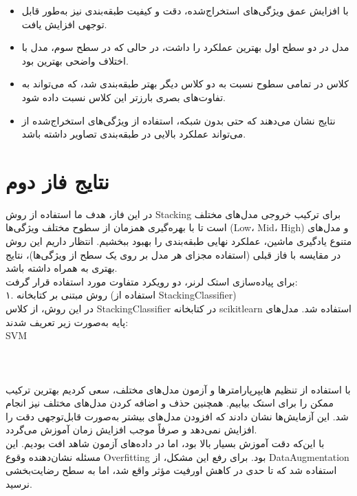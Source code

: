 \documentclass[a4paper,12pt]{article}
\let\nobreaksection\section
\renewcommand{\section}{\nobreaksection}
\begin{document}
\begin{itemize}
	\item با افزایش عمق ویژگی‌های استخراج‌شده، دقت و کیفیت طبقه‌بندی نیز به‌طور قابل توجهی افزایش یافت.
	\item مدل  در دو سطح اول بهترین عملکرد را داشت، در حالی که در سطح سوم، مدل  با اختلاف واضحی بهترین بود.
	\item کلاس  در تمامی سطوح نسبت به دو کلاس دیگر بهتر طبقه‌بندی شد، که می‌تواند به تفاوت‌های بصری بارزتر این کلاس نسبت داده شود.
	\item نتایج نشان می‌دهند که حتی بدون  شبکه، استفاده از ویژگی‌های استخراج‌شده از  می‌تواند عملکرد بالایی در طبقه‌بندی تصاویر داشته باشد.
\end{itemize}

\section{نتایج فاز دوم}
در این فاز، هدف ما استفاده از روش Stacking برای ترکیب خروجی مدل‌های مختلف است تا با بهره‌گیری همزمان از سطوح مختلف ویژگی‌ها (Low، Mid، High) و مدل‌های متنوع یادگیری ماشین، عملکرد نهایی طبقه‌بندی را بهبود ببخشیم. انتظار داریم این روش در مقایسه با فاز قبلی (استفاده مجزای هر مدل بر روی یک سطح از ویژگی‌ها)، نتایج بهتری به همراه داشته باشد.
\\
برای پیاده‌سازی استک لرنر، دو رویکرد متفاوت مورد استفاده قرار گرفت:
\\
۱. روش مبتنی بر کتابخانه (استفاده از StackingClassifier)\\
در این روش، از کلاس StackingClassifier در کتابخانه scikitlearn استفاده شد. مدل‌های پایه به‌صورت زیر تعریف شدند:\\
SVM \\
\\
\\
\\
با استفاده از تنظیم هایپرپارامترها و آزمون مدل‌های مختلف، سعی کردیم بهترین ترکیب ممکن را برای استک بیابیم. همچنین حذف و اضافه کردن مدل‌های مختلف نیز انجام شد. این آزمایش‌ها نشان دادند که افزودن مدل‌های بیشتر به‌صورت قابل‌توجهی دقت را افزایش نمی‌دهد و صرفاً موجب افزایش زمان آموزش می‌گردد.\\
با این‌که دقت آموزش بسیار بالا بود، اما در داده‌های آزمون شاهد افت بودیم. این مسئله نشان‌دهنده وقوع Overfitting بود. برای رفع این مشکل، از  DataAugmentation استفاده شد که تا حدی در کاهش اورفیت مؤثر واقع شد، اما به سطح رضایت‌بخشی نرسید.
\\
\end{document}
